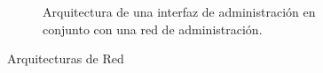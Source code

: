 \begin{figure}
\begin{subfigure}{.5\textwidth}
  \caption{Arquitectura de una interfaz de administración en conjunto con una red de administración.}
  \label{fig:interfaz_admon}
\end{subfigure}
\caption{Arquitecturas de Red}
\label{fig:Arq_red}
\end{figure}

